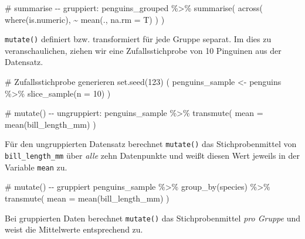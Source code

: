 \documentclass[
  a4paper,
  DIV=11,
  oneside]{scrreprt}
\newenvironment{Shaded}{\begin{snugshade}}{\end{snugshade}}
\newcommand{\NormalTok}[1]{\textcolor[rgb]{0.00,0.23,0.31}{#1}}
\begin{document}
\begin{Shaded}
\begin{Highlighting}[]
\NormalTok{\# summarise {-}{-} gruppiert:    }
\NormalTok{penguins\_grouped \%\textgreater{}\%}
\NormalTok{  summarise(}
\NormalTok{    across(}
\NormalTok{      where(is.numeric), }
\NormalTok{      \textasciitilde{} mean(., na.rm = T)}
\NormalTok{    )}
\NormalTok{  )}
\end{Highlighting}
\end{Shaded}

\texttt{mutate()} definiert bzw. transformiert für jede Gruppe separat.
Im dies zu veranschaulichen, ziehen wir eine Zufallsstichprobe von 10
Pinguinen aus der Datensatz.

\begin{Shaded}
\begin{Highlighting}[]
\NormalTok{\# Zufallsstichprobe generieren}
\NormalTok{set.seed(123)}
\NormalTok{(}
\NormalTok{  penguins\_sample \textless{}{-} penguins \%\textgreater{}\%}
\NormalTok{    slice\_sample(n = 10)  }
\NormalTok{)}
\end{Highlighting}
\end{Shaded}

\begin{Shaded}
\begin{Highlighting}[]
\NormalTok{\# mutate() {-}{-} ungruppiert:}
\NormalTok{penguins\_sample \%\textgreater{}\%}
\NormalTok{  transmute(}
\NormalTok{    mean = mean(bill\_length\_mm)}
\NormalTok{  )}
\end{Highlighting}
\end{Shaded}

Für den ungruppierten Datensatz berechnet \texttt{mutate()} das
Stichprobenmittel von \texttt{bill\_length\_mm} über \emph{alle} zehn
Datenpunkte und weißt diesen Wert jeweils in der Variable \texttt{mean}
zu.

\begin{Shaded}
\begin{Highlighting}[]
\NormalTok{\# mutate() {-}{-} gruppiert}
\NormalTok{penguins\_sample \%\textgreater{}\%}
\NormalTok{  group\_by(species) \%\textgreater{}\%}
\NormalTok{  transmute(}
\NormalTok{    mean = mean(bill\_length\_mm)}
\NormalTok{  )}
\end{Highlighting}
\end{Shaded}

Bei gruppierten Daten berechnet \texttt{mutate()} das Stichprobenmittel
\emph{pro Gruppe} und weist die Mittelwerte entsprechend zu.
\end{document}
